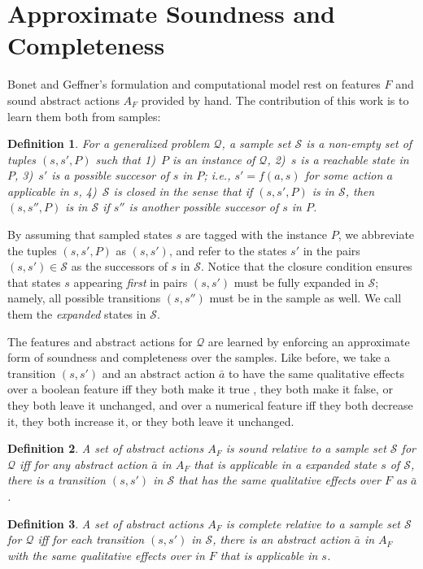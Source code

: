 \documentclass[letterpaper]{article} %
\newtheorem{definition}{Definition}
\newcommand{\Q}{\mathcal{Q}}
\renewcommand{\S}{\mathcal{S}}
\begin{document}
\section{Approximate Soundness and Completeness}


Bonet and Geffner's formulation and computational model rest on 
features $F$ and  sound abstract actions $A_F$ provided by hand.
The contribution of this work is to learn them both from samples:


\begin{definition}
 For a generalized problem $\Q$, a \emph{sample set}  $\S$ is a non-empty set of tuples  $(s,s',P)$
 such that 1)~$P$ is an instance of $\Q$, 2)~$s$ is a reachable state in $P$, 3)~$s'$
 is a possible succesor of $s$ in $P$; i.e., $s'=f(a,s)$ for some action $a$ applicable in $s$,
 4)~$\S$ is closed in the sense  that if $(s,s',P)$ is in $\S$, then $(s,s'',P)$ is in $\S$  if $s''$ is another possible succesor of $s$ in $P$.
\end{definition}

By assuming that sampled states $s$ are tagged with the instance $P$, 
we abbreviate the tuples $(s,s',P)$ as $(s,s')$, and refer to the
states $s'$ in  the pairs $(s,s') \in \S$ as the successors of
$s$ in $\S$. Notice that the closure condition ensures that
states $s$ appearing \emph{first} in pairs $(s,s')$ must be fully expanded in $\S$;
namely, all possible transitions $(s,s'')$ must be in the sample as well. We call them
the \emph{expanded} states in $\S$.

The features and abstract actions for $\Q$ are  learned by
enforcing an approximate form of soundness and completeness
over the samples. Like before,  we take a transition $(s,s')$ and an abstract action $\bar{a}$
to have  the same qualitative effects over a boolean  feature  iff they both make it true , they both make it false,  or
they both leave it unchanged,  and over a numerical feature  iff they both decrease it,  they both increase it,  or they both leave it unchanged.

\begin{definition}
  A set of abstract actions $A_F$ is sound \emph{relative to a  sample set} $\S$ for $\Q$
  iff for  any  abstract action $\bar{a}$ in $A_F$ that is applicable in  a expanded state $s$ of $\S$,
  there is a transition $(s,s')$ in $\S$ that has the same qualitative  effects over $F$ as $\bar{a}$.
\end{definition}

\begin{definition}
  A set of abstract actions $A_F$ is complete   \emph{relative to a sample set} $\S$ for $\Q$
  iff for each transition  $(s,s')$ in  $\S$, there is an abstract action $\bar{a}$ in $A_F$
  with the same qualitative effects over in $F$ that is applicable in $s$.
\end{definition}
\end{document}
